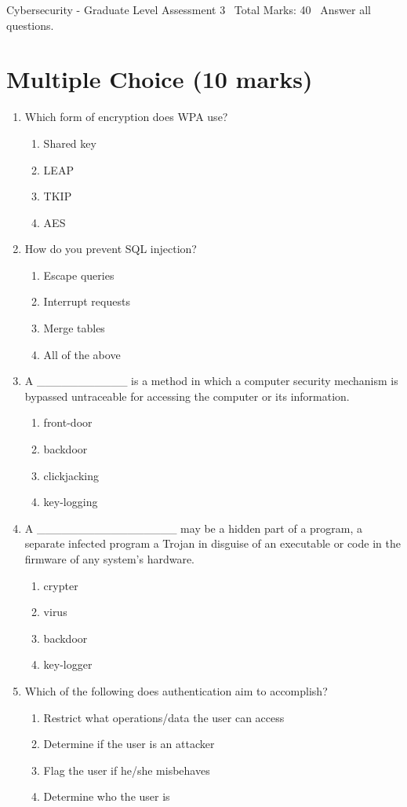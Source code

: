 \documentclass[12pt]{article}
\begin{document}
\begin{center}
Cybersecurity - Graduate Level Assessment 3 \
Total Marks: 40 \
Answer all questions.
\end{center}

\section*{Multiple Choice (10 marks)}
\begin{enumerate}[label=\arabic*.]
\item Which form of encryption does WPA use?
\begin{enumerate}[label=(\alph*)]
    \item Shared key
    \item LEAP
    \item TKIP
    \item AES
\end{enumerate}
\item How do you prevent SQL injection?
\begin{enumerate}[label=(\alph*)]
    \item Escape queries
    \item Interrupt requests
    \item Merge tables
    \item All of the above
\end{enumerate}
\item A \_\_\_\_\_\_\_\_\_\_\_ is a method in which a computer security mechanism is bypassed untraceable for accessing the computer or its information.
\begin{enumerate}[label=(\alph*)]
    \item front-door
    \item backdoor
    \item clickjacking
    \item key-logging
\end{enumerate}
\item A \_\_\_\_\_\_\_\_\_\_\_\_\_\_\_\_\_ may be a hidden part of a program, a separate infected program a Trojan in disguise of an executable or code in the firmware of any system's hardware.
\begin{enumerate}[label=(\alph*)]
    \item crypter
    \item virus
    \item backdoor
    \item key-logger
\end{enumerate}
\item Which of the following does authentication aim to accomplish?
\begin{enumerate}[label=(\alph*)]
    \item Restrict what operations/data the user can access
    \item Determine if the user is an attacker
    \item Flag the user if he/she misbehaves
    \item Determine who the user is
\end{enumerate}
\end{enumerate}
\end{document}
